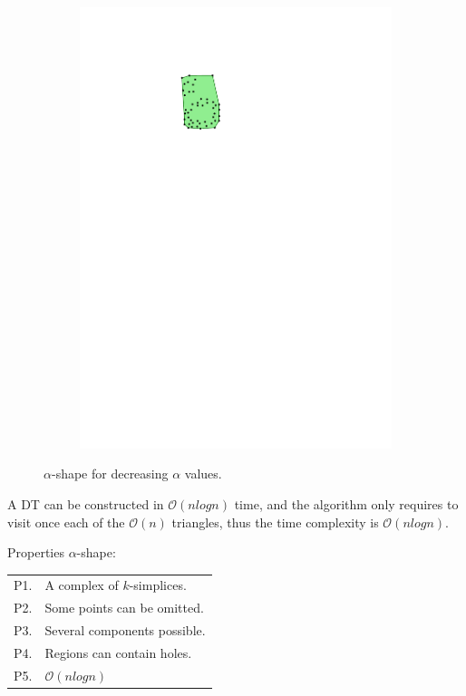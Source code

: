 \begin{figure}
\begin{subfigure}[b]{0.15\linewidth}
    \includegraphics[page=5,width=\textwidth]{figs/alphashape.pdf}
    \caption{}
    \label{fig:aplhashape:e}
  \end{subfigure}
  \qquad 
\caption{$\alpha$-shape for decreasing $\alpha$ values.}
\label{fig:alphashape}
\end{figure}

%

A DT can be constructed in $\mathcal{O}(n log n)$ time, and the algorithm only requires to visit once each of the $\mathcal{O}(n)$ triangles, thus the time complexity is $\mathcal{O}(n log n)$.

%

Properties $\alpha$-shape:
\\
\begin{tabular}{@{}ll@{}}
\toprule
  P1. & A complex of $k$-simplices.  \\  
  P2. & Some points can be omitted. \\ 
  P3. & Several components possible.  \\ 
  P4. & Regions can contain holes.  \\  
  P5. & $\mathcal{O}(n log n)$  \\ 
\bottomrule
\end{tabular}



